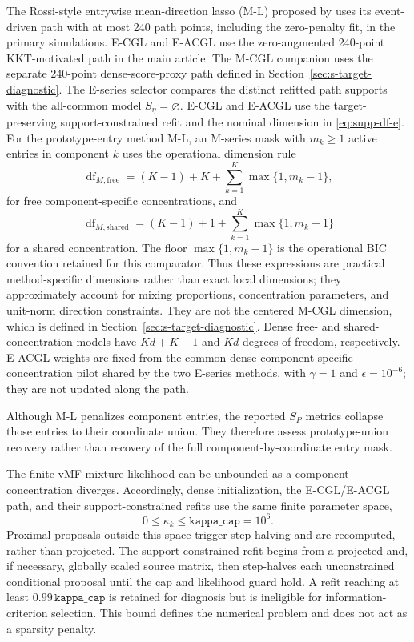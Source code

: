 \documentclass[preprint,12pt,authoryear]{elsarticle}
\begin{document}
The Rossi-style entrywise mean-direction lasso (M-L) proposed by
\citet{rossi2022sparsevmf} uses its event-driven path with at most 240 path
points, including the zero-penalty fit, in the primary simulations. E-CGL and
E-ACGL use the zero-augmented 240-point
KKT-motivated path in the main article. The M-CGL companion uses the separate
240-point dense-score-proxy path defined in
Section~\ref{sec:s-target-diagnostic}. The E-series selector compares the distinct
refitted path supports with the all-common model
$S_\eta=\varnothing$. E-CGL and E-ACGL use the target-preserving
support-constrained refit and the nominal dimension in
\eqref{eq:supp-df-e}.
For the prototype-entry method M-L, an M-series mask with
$m_k\geq1$ active entries in component $k$ uses the operational dimension rule
\[
\operatorname{df}_{M,\mathrm{free}}
=(K-1)+K+\sum_{k=1}^K\max\{1,m_k-1\},
\]
for free component-specific concentrations, and
\[
\operatorname{df}_{M,\mathrm{shared}}
=(K-1)+1+\sum_{k=1}^K\max\{1,m_k-1\}
\]
for a shared concentration. The floor $\max\{1,m_k-1\}$ is the operational
BIC convention retained for this comparator. Thus these expressions are
practical method-specific dimensions rather than exact local dimensions;
they approximately account for mixing proportions, concentration parameters,
and unit-norm direction constraints.
They are not the centered M-CGL dimension, which is defined in
Section~\ref{sec:s-target-diagnostic}. Dense free- and shared-concentration
models have $Kd+K-1$ and $Kd$ degrees of freedom, respectively. E-ACGL weights
are fixed from the common dense component-specific-concentration pilot shared
by the two E-series methods, with $\gamma=1$ and $\epsilon=10^{-6}$; they are
not updated along the path.

Although M-L penalizes component entries, the reported $S_P$ metrics collapse
those entries to their coordinate union. They therefore assess
prototype-union recovery rather than recovery of the full component-by-coordinate
entry mask.

The finite vMF mixture likelihood can be unbounded as a component
concentration diverges.
Accordingly, dense initialization, the E-CGL/E-ACGL path, and their
support-constrained refits use the same finite parameter space,
\[
0\leq\kappa_k\leq\texttt{kappa\_cap}=10^6.
\]
Proximal proposals outside this space trigger step halving and are recomputed,
rather than projected. The support-constrained refit begins from a projected
and, if necessary, globally scaled source matrix, then step-halves each
unconstrained conditional proposal until the cap and likelihood guard hold. A
refit reaching at least
$0.99\,\texttt{kappa\_cap}$ is retained for diagnosis but is ineligible for
information-criterion selection. This bound defines the numerical problem and
does not act as a sparsity penalty.
\end{document}
